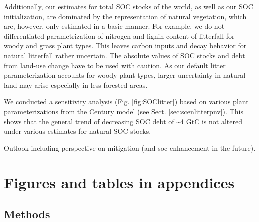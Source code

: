 \documentclass[gc, manuscript]{copernicus}
\begin{document}
Additionally, our estimates for total SOC stocks of the world, as well as our SOC initialization, are dominated by the representation of natural vegetation, which are, however, only estimated in a basic manner. For example, we do not differentiated parametrization of nitrogen and lignin content of litterfall for woody and grass plant types. This leaves carbon inputs and decay behavior for natural litterfall rather uncertain. The absolute values of SOC stocks and debt from land-use change have to be used with caution. As our default litter parameterization accounts for woody plant types, larger uncertainty in natural land may arise especially in less forested areas.

We conducted a sensitivity analysis (Fig. \ref{fig:SOClitter}) based on various plant parameterizations from the Century model (see Sect. \ref{sec:scenlitterpnv}). This shows that the general trend of decreasing SOC debt of \textasciitilde4 GtC is not altered under various estimates for natural SOC stocks.
\newpage

\conclusions

Outlook including perspective on mitigation (and soc enhancement in the future).
\newpage








\appendix
\section{Figures and tables in appendices}

\subsection{Methods}
\end{document}
